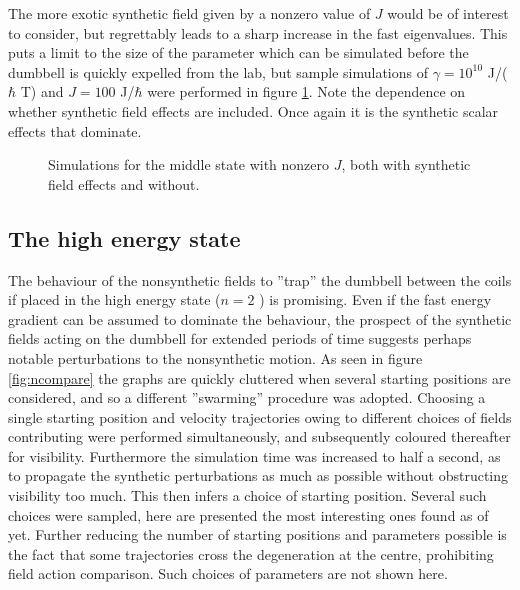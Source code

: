 \documentclass[main.tex]{subfiles}
\begin{document}
The more exotic synthetic field given by a nonzero value of \(J\) would be of interest to
consider, but regrettably leads to a sharp increase in the fast eigenvalues. This puts a
limit to the size of the parameter which can be simulated before the dumbbell is quickly
expelled from the lab, but sample simulations of \(\gamma = 10^{10}\) J/(\(\hbar{}\) T) and \(J = 100\) J/\(\hbar{}\) were performed
in figure \ref{fig:n1Je2}. Note the dependence on whether synthetic field effects are
included. Once again it is the synthetic scalar effects that dominate.
\begin{figure}[h]
    \centering
    \qquad
    \caption{\centering Simulations for the middle state with nonzero \(J\), both with synthetic field
    effects and without.}%
    \label{fig:n1Je2}
\end{figure}


\subsection{The high energy state}\label{sec:reshigh}
The behaviour of the nonsynthetic fields to ''trap'' the dumbbell between the coils if
placed in the high energy state (\(n = 2\) ) is promising. Even if the fast energy gradient can be
assumed to dominate the behaviour, the prospect of the synthetic fields acting on the
dumbbell for extended periods of time suggests perhaps notable perturbations to the
nonsynthetic motion. As seen in figure \ref{fig:ncompare} the graphs are quickly cluttered
when several starting positions are considered, and so a different ''swarming''
procedure was adopted. Choosing a single starting position and velocity trajectories owing
to different choices of fields contributing were performed simultaneously, and subsequently
coloured thereafter for visibility. Furthermore the simulation time was increased to half a
second, as to propagate the synthetic perturbations as much as possible without obstructing
visibility too much. This then infers a choice of starting position. Several such choices were sampled, here are
presented the most interesting ones found as of yet. Further reducing the number of
starting positions and parameters possible is the fact that some trajectories cross the
degeneration at the centre, prohibiting field action comparison. Such choices of parameters
are not shown here. 
\end{document}
